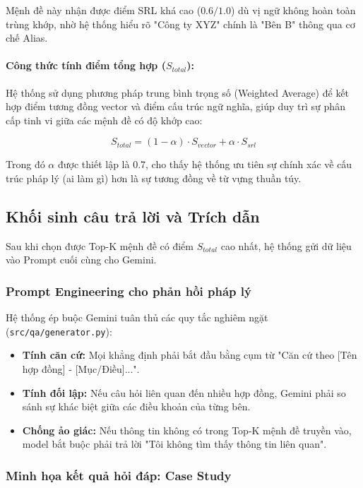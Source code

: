 Mệnh đề này nhận được điểm SRL khá cao ($0.6/1.0$) dù vị ngữ không hoàn toàn trùng khớp, nhờ hệ thống hiểu rõ "Công ty XYZ" chính là "Bên B" thông qua cơ chế Alias.

\paragraph{Công thức tính điểm tổng hợp ($S_{total}$):}
Hệ thống sử dụng phương pháp trung bình trọng số (Weighted Average) để kết hợp điểm tương đồng vector và điểm cấu trúc ngữ nghĩa, giúp duy trì sự phân cấp tinh vi giữa các mệnh đề có độ khớp cao:

\begin{equation}
S_{total} = (1 - \alpha) \cdot S_{vector} + \alpha \cdot S_{srl}
\end{equation}

Trong đó $\alpha$ được thiết lập là 0.7, cho thấy hệ thống ưu tiên sự chính xác về cấu trúc pháp lý (ai làm gì) hơn là sự tương đồng về từ vựng thuần túy.

\subsection{Khối sinh câu trả lời và Trích dẫn}

Sau khi chọn được Top-K mệnh đề có điểm $S_{total}$ cao nhất, hệ thống gửi dữ liệu vào Prompt cuối cùng cho Gemini. 

\subsubsection{Prompt Engineering cho phản hồi pháp lý}
Hệ thống ép buộc Gemini tuân thủ các quy tắc nghiêm ngặt (\texttt{src/qa/generator.py}):
\begin{itemize}
    \item \textbf{Tính căn cứ:} Mọi khẳng định phải bắt đầu bằng cụm từ "Căn cứ theo [Tên hợp đồng] - [Mục/Điều]...".
    \item \textbf{Tính đối lập:} Nếu câu hỏi liên quan đến nhiều hợp đồng, Gemini phải so sánh sự khác biệt giữa các điều khoản của từng bên.
    \item \textbf{Chống ảo giác:} Nếu thông tin không có trong Top-K mệnh đề truyền vào, model bắt buộc phải trả lời "Tôi không tìm thấy thông tin liên quan".
\end{itemize}

\subsubsection{Minh họa kết quả hỏi đáp: Case Study}

